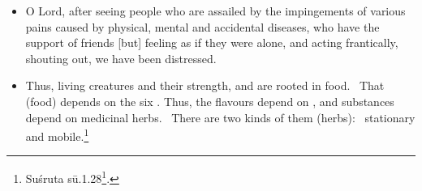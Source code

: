 \documentclass[12pt]{article}
\begin{document}
\begin{itemize}
    \item[1.4]
O Lord, after seeing people who are assailed by the impingements of various pains caused by 
physical, mental and accidental diseases, who have the support of friends [but] feeling as if they 
were alone, and acting frantically, shouting out, we have been distressed. 
    
    
   
    
    \item [1.28] Thus, living creatures and their strength,
 and  are rooted in food.  That
(food) depends on the six . Thus, the flavours depend
on , and substances depend on medicinal herbs. 
There are two kinds of them (herbs):  stationary and mobile.\footnote{Suśruta
sū.1.28\footcites[I, 21]{shar-susr}[7]{susr-trikamji2004}.}
\end{itemize}

\nocite{adri-engl}


\newpage


    \printshorthands

    \printbibliography[notkeyword=edition,
        notkeyword=shorthand]
    
    
    \newpage
    
    \printindex[lexical]
    
\end{document}
